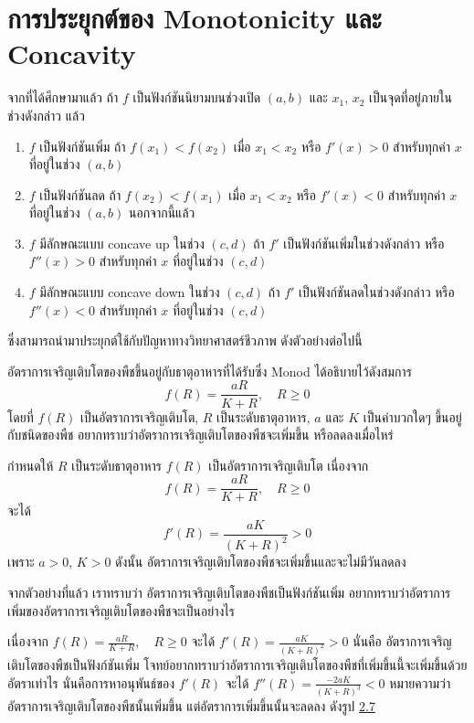 \documentclass[
]{book}
\begin{document}
\section{การประยุกต์ของ Monotonicity และ
Concavity}\label{uxe01uxe32uxe23uxe1buxe23uxe30uxe22uxe01uxe15uxe02uxe2duxe07-monotonicity-uxe41uxe25uxe30-concavity}

จากที่ได้ศึกษามาแล้ว ถ้า \(f\) เป็นฟังก์ชันนิยามบนช่วงเปิด \((a,b)\) และ \(x_1\),
\(x_2\) เป็นจุดที่อยู่ภายในช่วงดังกล่าว แล้ว

\begin{enumerate}
\def\labelenumi{(\arabic{enumi})}
\item
  \(f\) เป็นฟังก์ชันเพิ่ม ถ้า \(f(x_1)<f(x_2)\) เมื่อ \(x_1<x_2\) หรือ \(f'(x)>0\)
  สำหรับทุกค่า \(x\) ที่อยู่ในช่วง \((a,b)\)
\item
  \(f\) เป็นฟังก์ชันลด ถ้า \(f(x_2)<f(x_1)\) เมื่อ \(x_1<x_2\) หรือ \(f'(x)<0\)
  สำหรับทุกค่า \(x\) ที่อยู่ในช่วง \((a,b)\) นอกจากนี้แล้ว
\item
  \(f\) มีลักษณะแบบ concave up ในช่วง \((c,d)\) ถ้า \(f'\)
  เป็นฟังก์ชันเพิ่มในช่วงดังกล่าว หรือ \(f''(x)>0\) สำหรับทุกค่า \(x\) ที่อยู่ในช่วง
  \((c,d)\)
\item
  \(f\) มีลักษณะแบบ concave down ในช่วง \((c,d)\) ถ้า \(f'\)
  เป็นฟังก์ชันลดในช่วงดังกล่าว หรือ \(f''(x)<0\) สำหรับทุกค่า \(x\) ที่อยู่ในช่วง
  \((c,d)\)
\end{enumerate}

ซึ่งสามารถนำมาประยุกต์ใช้กับปัญหาทางวิทยาศาสตร์ชีวภาพ ดังตัวอย่างต่อไปนี้

อัตราการเจริญเติบโตของพืชขึ้นอยู่กับธาตุอาหารที่ได้รับซึ่ง Monod ได้อธิบายไว้ดังสมการ
\[f(R)=\frac{aR}{K+R}, \quad R \ge 0\] โดยที่ \(f(R)\)
เป็นอัตราการเจริญเติบโต, \(R\) เป็นระดับธาตุอาหาร, \(a\) และ \(K\) เป็นค่าบวกใดๆ
ขึ้นอยู่กับชนิดของพืช อยากทราบว่าอัตราการเจริญเติบโตของพืชจะเพิ่มขึ้น หรือลดลงเมื่อไหร่

กำหนดให้ \(R\) เป็นระดับธาตุอาหาร \(f(R)\) เป็นอัตราการเจริญเติบโต เนื่องจาก
\[f(R)=\frac{aR}{K+R},  \quad      R \ge 0\] จะได้
\[f'(R)=\frac{aK}{(K+R)^2}>0\] เพราะ \(a>0\), \(K>0\) ดังนั้น
อัตราการเจริญเติบโตของพืชจะเพิ่มขึ้นและจะไม่มีวันลดลง

จากตัวอย่างที่แล้ว เราทราบว่า อัตราการเจริญเติบโตของพืชเป็นฟังก์ชันเพิ่ม
อยากทราบว่าอัตราการเพิ่มของอัตราการเจริญเติบโตของพืชจะเป็นอย่างไร

เนื่องจาก \(\displaystyle f(R)=\frac{aR}{K+R}, \quad R \ge 0\) จะได้
\(\displaystyle f'(R)=\frac{aK}{(K+R)^2}>0\) นั่นคือ
อัตราการเจริญเติบโตของพืชเป็นฟังก์ชันเพิ่ม
โจทย์อยากทราบว่าอัตราการเจริญเติบโตของพืชที่เพิ่มขึ้นนี้จะเพิ่มขึ้นด้วยอัตราเท่าไร
นั่นคือการหาอนุพันธ์ของ \(f'(R)\) จะได้
\(\displaystyle f''(R)=\frac{-2aK}{(K+R)^3}<0\)
หมายความว่าอัตราการเจริญเติบโตของพืชนั้นเพิ่มขึ้น แต่อัตราการเพิ่มขึ้นนั้นจะลดลง ดังรูป
\hyperref[fig-monod]{2.7}
\end{document}
